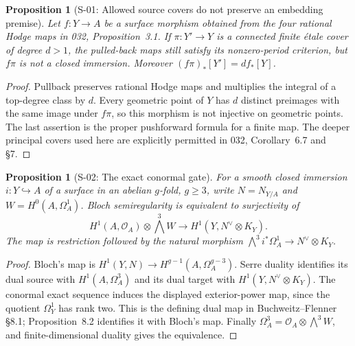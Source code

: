 \documentclass[11pt,a4paper]{article}
\newtheorem{proposition}[theorem]{Proposition}
\theoremstyle{definition}
\begin{document}
\begin{proposition}[S-01: Allowed source covers do not preserve an embedding premise]
\label{prop:semireg-cover-domain}
Let $f:Y\to A$ be a surface morphism obtained from the four rational
Hodge maps in 032, Proposition~3.1. If $\pi:Y'\to Y$ is a connected finite
\'etale cover of degree $d>1$, the pulled-back maps still satisfy its
nonzero-period criterion, but $f\pi$ is not a closed immersion.
Moreover $(f\pi)_*[Y']=d f_*[Y]$.
\end{proposition}
\begin{proof}
Pullback preserves rational Hodge maps and multiplies the integral of
a top-degree class by $d$. Every geometric point of $Y$ has $d$ distinct
preimages with the same image under $f\pi$, so this morphism is not
injective on geometric points. The last assertion is the proper
pushforward formula for a finite map. The deeper principal covers
used here are explicitly permitted in 032, Corollary~6.7 and \S7.
\end{proof}

\begin{proposition}[S-02: The exact conormal gate]
\label{prop:semireg-dual-gate}
For a smooth closed immersion $i:Y\hookrightarrow A$ of a surface in
an abelian $g$-fold, $g\geq3$, write $N=N_{Y/A}$ and
$W=H^0(A,\Omega_A^1)$. Bloch semiregularity is equivalent to
surjectivity of
\[
 H^1(A,\mathcal O_A)\otimes\bigwedge^3W
 \longrightarrow H^1(Y,N^\vee\otimes K_Y).
\]
The map is restriction followed by the natural morphism
$\bigwedge^3 i^*\Omega_A^1\to N^\vee\otimes K_Y$.
\end{proposition}
\begin{proof}
Bloch's map is
$H^1(Y,N)\to H^{g-1}(A,\Omega_A^{g-3})$.
Serre duality identifies its dual source with $H^1(A,\Omega_A^3)$
and its dual target with $H^1(Y,N^\vee\otimes K_Y)$.
The conormal exact sequence induces the displayed exterior-power
map, since the quotient $\Omega_Y^1$ has rank two.
This is the defining dual map in Buchweitz--Flenner \S8.1;
Proposition~8.2 identifies it with Bloch's map.
Finally $\Omega_A^3=\mathcal O_A\otimes\bigwedge^3W$,
and finite-dimensional duality gives the equivalence.
\end{proof}
\end{document}
